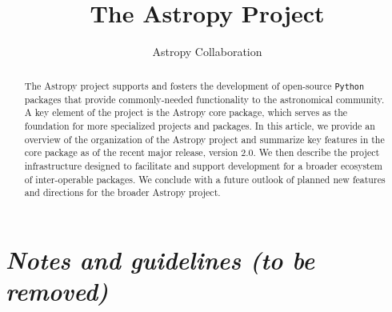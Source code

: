 \documentclass[modern]{aastex61}
\newcommand{\package}[1]{\texttt{#1}\xspace}
\newcommand{\python}{\package{Python}\xspace}
\newcommand{\astropy}{Astropy\xspace}
\begin{document}
\draft{\today}

\title{The Astropy Project}


\author{Astropy Collaboration}

\begin{abstract}
The \astropy project supports and fosters the development of open-source
\python packages that provide commonly-needed functionality to the astronomical
community.
A key element of the project is the \astropy core package, which serves as the
foundation for more specialized projects and packages.
In this article, we provide an overview of the organization of the \astropy
project and summarize key features in the core package as of the recent major
release, version 2.0.
We then describe the project infrastructure designed to facilitate and support
development for a broader ecosystem of inter-operable packages.
We conclude with a future outlook of planned new features and directions for the
broader \astropy project.
\end{abstract}

\keywords{}

\section*{\textit{Notes and guidelines (to be removed)}}
\end{document}
